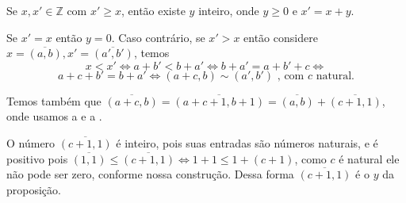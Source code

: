\documentclass[../main.tex]{subfiles}
\begin{document}
\begin{prop}\label{int-prop-diferencaPositiva}
    Se $x,x' \in \mathbb{Z}$ com $x' \geq x$, então existe $y$ inteiro, onde $y \geq 0$ e $x' = x+y$.
\end{prop}
\begin{dem}
    Se $x' = x$ então $y=0$.
    Caso contrário, se $x'>x$ então considere $x = \overline{(a,b)}, x'=\overline{(a',b')}$, temos 
    \[ x < x' \iff a+b' < b + a' \iff b+a' = a+b'+c \iff \] 
    \[  a+c+b' = b+a' \iff (a+c,b) \sim (a',b') \text{ , com $c$ natural.} \] 

    Temos também que $\overline{(a+c,b)} = \overline{(a+c+1,b+1)} = \overline{(a,b)} + \overline{(c+1, 1)}$, onde usamos a  e a .

    O número $\overline{(c+1,1)}$ é inteiro, pois suas entradas são números naturais, e é positivo pois $\overline{(1,1)} \leq \overline{(c+1,1)} 
    \iff 1+1 \leq 1+(c+1)$, como $c$ é natural ele não pode ser zero, conforme nossa construção. Dessa forma $\overline{(c+1,1)}$ é o $y$ da proposição.
\end{dem}
\end{document}
